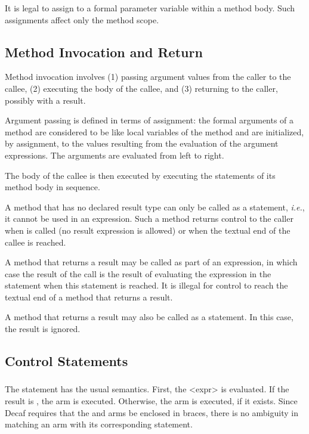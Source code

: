 It is legal to assign to a formal parameter variable within a method
body.  Such assignments affect only the method scope.

\subsection*{Method Invocation and Return}

Method invocation involves (1) passing argument values from the caller
to the callee, (2) executing the body of the callee, and (3) returning
to the caller, possibly with a result.

Argument passing is defined in terms of assignment: the formal arguments
of a method are considered to be like local variables of the method and
are initialized, by assignment, to the values resulting from the
evaluation of the argument expressions.  The arguments are evaluated
from left to right.

The body of the callee is then executed by executing the statements of
its method body in sequence.

A method that has no declared result type can only be called as a
statement, {\em i.e.}, it cannot be used in an expression.  Such a
method returns control to the caller when  is called (no
result expression is allowed) or when the textual end of the callee is
reached.

A method that returns a result may be called as part of an expression,
in which case the result of the call is the result of evaluating the
expression in the  statement when this statement is reached.
It is illegal for control to reach the textual end of a method that
returns a result.

A method that returns a result may also be called as a statement.  In
this case, the result is ignored.

\subsection*{Control Statements}

\subsubsection*{}
The  statement has the usual semantics.  First, the {\bnf <expr>}
is evaluated.  If the result is , the  arm is
executed.  Otherwise, the  arm is executed, if it exists.
Since Decaf requires that the  and  arms
be enclosed in braces, there is no ambiguity in matching an 
arm with its corresponding  statement.

